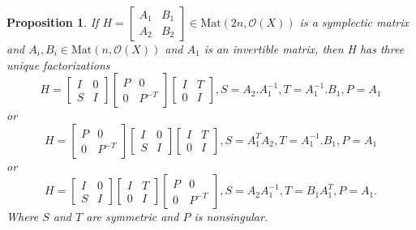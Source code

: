\documentclass[10pt]{amsart}
\newtheorem{prop}[theo]{Proposition}
\theoremstyle{remark}
\begin{document}
\begin{prop}\label{fact-1}
If $H = \left[\begin{array}{ccc} A_1 & B_1 \\ A_2 & B_2\end{array}\right] \in \mathrm{Mat}(2n,\mathcal{O}(X))$ is a symplectic matrix and $A_i, B_i \in \mathrm{Mat}(n,\mathcal{O}(X))$ and $A_1$ is  an invertible matrix, then H has three unique factorizations 
\begin{equation}
    H = \left[\begin{array}{ccc} I & 0 \\ S & I\end{array}\right]\left[\begin{array}{ccc} P & 0 \\ 0 & P^{-T}\end{array}\right]\left[\begin{array}{ccc} I & T \\ 0 & I\end{array}\right],   S = A_2.A_1^{-1}, T=A_1^{-1}.B_1, P = A_1 
\end{equation}
or
\begin{equation}
     H = \left[\begin{array}{ccc} P & 0 \\ 0 & P^{-T}\end{array}\right]\left[\begin{array}{ccc} I & 0 \\ S & I\end{array}\right]\left[\begin{array}{ccc} I & T \\ 0 & I\end{array}\right], S = A^T_1A_2, T = A^{-1}_1.B_1, P = A_1
\end{equation}
or
\begin{equation}
     H = \left[\begin{array}{ccc} I & 0 \\ S & I\end{array}\right]\left[\begin{array}{ccc} I & T \\ 0 & I\end{array}\right]\left[\begin{array}{ccc} P & 0 \\ 0 & P^{-T}\end{array}\right], S = A_2A^{-1}_1, T = B_1A^T_1, P = A_1.
\end{equation}
Where $S$ and $T$ are symmetric and $P$ is nonsingular.
\end{prop}
\end{document}
